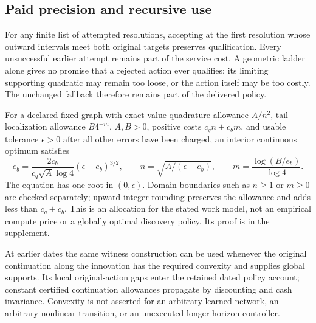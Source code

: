 \subsection{Paid precision and recursive use}
For any finite list of attempted resolutions, accepting at the first
resolution whose outward intervals meet both original targets preserves
qualification.  Every unsuccessful earlier attempt remains part of the
service cost.  A geometric ladder alone gives no promise that a rejected
action ever qualifies: its limiting supporting quadratic may remain too
loose, or the action itself may be too costly.  The unchanged fallback
therefore remains part of the delivered policy.

For a declared fixed graph with exact-value quadrature allowance
$A/n^2$, tail-localization allowance $B4^{-m}$, $A,B>0$, positive costs
$c_qn+c_bm$, and usable tolerance $\epsilon>0$ after all other errors
have been charged, an interior continuous optimum satisfies
\begin{equation}\label{eq:tailallocation119}
 e_b=\frac{2c_b}{c_q\sqrt A\log4}
                    (\epsilon-e_b)^{3/2},\qquad
 n=\sqrt{A/(\epsilon-e_b)},\qquad
 m=\frac{\log(B/e_b)}{\log4}.
\end{equation}
The equation has one root in $(0,\epsilon)$.  Domain boundaries such
as $n\ge1$ or $m\ge0$ are checked separately; upward integer rounding
preserves the allowance and adds less than $c_q+c_b$.  This is an
allocation for the stated work model, not an empirical compute price
or a globally optimal discovery policy.  Its proof is in the supplement.

At earlier dates the same witness construction can be used whenever the
original continuation along the innovation has the required convexity
and supplies global supports.  Its local original-action gaps enter the
retained dated policy account; constant certified continuation allowances
propagate by discounting and cash invariance.  Convexity is not asserted
for an arbitrary learned network, an arbitrary nonlinear transition, or
an unexecuted longer-horizon controller.
